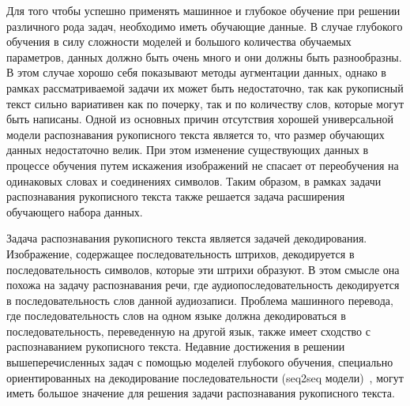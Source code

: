 Для того чтобы успешно применять машинное и глубокое обучение при решении различного рода задач, необходимо иметь обучающие данные.
В случае глубокого обучения в силу сложности моделей и большого количества обучаемых параметров, данных должно быть очень много и они должны быть разнообразны.
В этом случае хорошо себя показывают методы аугментации данных, однако в рамках рассматриваемой задачи их может быть недостаточно,
так как рукописный текст сильно вариативен как по почерку, так и по количеству слов, которые могут быть написаны.
Одной из основных причин отсутствия хорошей универсальной модели распознавания рукописного текста является то, что размер обучающих данных недостаточно велик.
При этом изменение существующих данных в процессе обучения путем искажения изображений не спасает от переобучения на одинаковых словах и соединениях символов.
Таким образом, в рамках задачи распознавания рукописного текста также решается задача расширения обучающего набора данных.

Задача распознавания рукописного текста является задачей декодирования.
Изображение, содержащее последовательность штрихов, декодируется в последовательность символов, которые эти штрихи образуют.
В этом смысле она похожа на задачу распознавания речи, где аудиопоследовательность декодируется в последовательность слов данной аудиозаписи.
Проблема машинного перевода, где последовательность слов на одном языке должна декодироваться в последовательность,
переведенную на другой язык, также имеет сходство с распознаванием рукописного текста.
Недавние достижения в решении вышеперечисленных задач с помощью моделей глубокого обучения,
специально ориентированных на декодирование последовательности (seq2seq модели)~\cite{sutskever2014sequence},
могут иметь большое значение для решения задачи распознавания рукописного текста.
